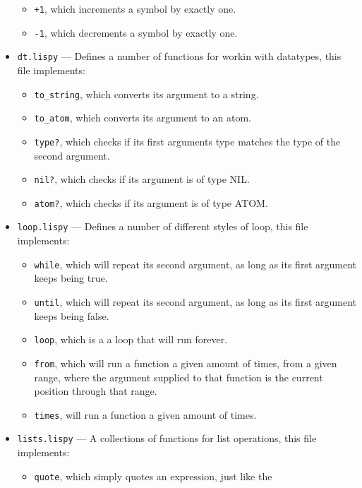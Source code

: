 \documentclass{article}
\newcommand{\code}[1]{\texttt{#1}}
\begin{document}
\begin{itemize}
\begin{itemize}
          \item \code{+1}, which increments a symbol by exactly one.
          \item \code{-1}, which decrements a symbol by exactly one.
        \end{itemize}
      \item \code{dt.lispy} --- Defines a number of functions for workin with
      datatypes, this file implements:
        \begin{itemize}
          \item \code{to\_string}, which converts its argument to a string.
          \item \code{to\_atom}, which converts its argument to an atom.
          \item \code{type?}, which checks if its first arguments type matches
          the type of the second argument.
          \item \code{nil?}, which checks if its argument is of type NIL.
          \item \code{atom?}, which checks if its argument is of type ATOM.
        \end{itemize}
      \item \code{loop.lispy} --- Defines a number of different styles of loop,
      this file implements:
        \begin{itemize}
          \item \code{while}, which will repeat its second argument, as long
          as its first argument keeps being true.
          \item \code{until}, which will repeat its second argument, as long
          as its first argument keeps being false.
          \item \code{loop}, which is a a loop that will run forever.
          \item \code{from}, which will run a function a given amount of times,
          from a given range, where the argument supplied to that function is
          the current position through that range.
          \item \code{times}, will run a function a given amount of times.
        \end{itemize}
      \item \code{lists.lispy} --- A collections of functions for list operations,
      this file implements:
        \begin{itemize}
          \item \code{quote}, which simply quotes an expression, just like the

\end{itemize}
\end{itemize}
\end{document}
